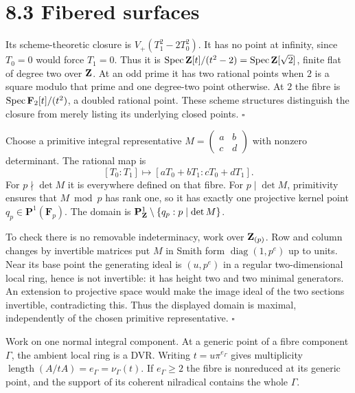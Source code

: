 \documentclass[11pt]{article}
\let\chapterexercise\exercise
\renewcommand{\exercise}[2]{\Needspace{8\baselineskip}\chapterexercise{#1}{#2}}
\begin{document}
\section*{8.3 Fibered surfaces}

\pf
Its scheme-theoretic closure is $V_+(T_1^2-2T_0^2)$. It has no point at infinity, since $T_0=0$ would force $T_1=0$. Thus it is $\operatorname{Spec}\mathbf Z[t]/(t^2-2)=\operatorname{Spec}\mathbf Z[\sqrt2]$, finite flat of degree two over $\mathbf Z$. At an odd prime it has two rational points when $2$ is a square modulo that prime and one degree-two point otherwise. At $2$ the fibre is $\operatorname{Spec}\mathbf F_2[t]/(t^2)$, a doubled rational point. These scheme structures distinguish the closure from merely listing its underlying closed points. \hfill$\square$

\pf
Choose a primitive integral representative $M=\left(\begin{smallmatrix}a&b\\c&d\end{smallmatrix}\right)$ with nonzero determinant. The rational map is
\[ [T_0:T_1]\longmapsto[aT_0+bT_1:cT_0+dT_1]. \]
For $p\nmid\det M$ it is everywhere defined on that fibre. For $p\mid\det M$, primitivity ensures that $M\bmod p$ has rank one, so it has exactly one projective kernel point $q_p\in\mathbf P^1(\mathbf F_p)$. The domain is $\mathbf P^1_\mathbf Z\setminus\{q_p:p\mid\det M\}$.

To check there is no removable indeterminacy, work over $\mathbf Z_{(p)}$. Row and column changes by invertible matrices put $M$ in Smith form $\operatorname{diag}(1,p^e)$ up to units. Near its base point the generating ideal is $(u,p^e)$ in a regular two-dimensional local ring, hence is not invertible: it has height two and two minimal generators. An extension to projective space would make the image ideal of the two sections invertible, contradicting this. Thus the displayed domain is maximal, independently of the chosen primitive representative. \hfill$\square$

\pf
Work on one normal integral component. At a generic point of a fibre component $\Gamma$, the ambient local ring is a DVR. Writing $t=u\pi^{e_\Gamma}$ gives multiplicity $\operatorname{length}(A/tA)=e_\Gamma=\nu_\Gamma(t)$. If $e_\Gamma\ge2$ the fibre is nonreduced at its generic point, and the support of its coherent nilradical contains the whole $\Gamma$.
\end{document}
